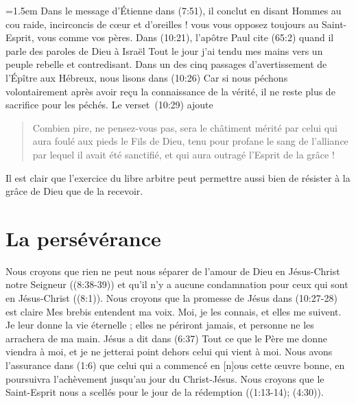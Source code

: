 \begin{digestpar}{}
\begin{pocketpar}{\emergencystretch=1.5em}
Dans le message d'Étienne dans
 (7:51), il conclut en disant\frcolon
 \Og Hommes au cou raide, incirconcis de cœur et d'oreilles !
 vous vous opposez toujours au Saint-Esprit, vous comme vos pères. \Fg{}
 Dans (10:21),
 l'apôtre Paul cite (65:2)
 quand il parle des paroles de Dieu à Israël\frcolon
 \Og Tout le jour j'ai tendu mes mains vers un peuple rebelle et contredisant. \Fg{}
 Dans un des cinq passages d'avertissement de l'Épître aux Hébreux,
 nous lisons dans (10:26)\frcolon
 \Og Car si nous péchons volontairement après avoir reçu la connaissance de la vérité,
 il ne reste plus de sacrifice pour les péchés. \Fg{}
 Le verset~(10:29) ajoute\frcolon
\end{pocketpar}
\end{digestpar}

\begin{quote}
\begin{digestpar}{}
\begin{pocketpar}{}
 \Og Combien pire, ne pensez-vous pas, sera le châtiment mérité par celui qui
 aura foulé aux pieds le Fils de Dieu, tenu pour profane le sang de l'alliance
 par lequel il avait été sanctifié, et qui aura outragé l'Esprit de la grâce ! \Fg{}
\end{pocketpar}
\end{digestpar}
\end{quote}

Il est clair que l'exercice du libre arbitre peut permettre aussi bien de résister
 à la grâce de Dieu que de la recevoir.

\section*{La persévérance}

\begin{digestpar}{}
Nous croyons que rien ne peut nous séparer de l'amour de Dieu en Jésus-Christ notre Seigneur
 ((8:38-39))
 et qu'il n'y a aucune condamnation pour ceux qui sont en Jésus-Christ
 ((8:1)).
 Nous croyons que la promesse de Jésus dans (10:27-28) est claire\frcolon
 \Og Mes brebis entendent ma voix. Moi, je les connais, et elles me suivent.
 Je leur donne la vie éternelle ; elles ne périront jamais,
 et personne ne les arrachera de ma main. \Fg{}
 Jésus a dit dans (6:37)\frcolon
 \Og Tout ce que le Père me donne viendra à moi,
 et je ne jetterai point dehors celui qui vient à moi. \Fg{}
 Nous avons l'assurance dans (1:6) \Og que celui qui a commencé
 en [n]ous cette œuvre bonne, en poursuivra l'achèvement jusqu'au jour
 du Christ-Jésus. \Fg{}
 Nous croyons que le Saint-Esprit nous a scellés
 pour le jour de la rédemption ((1:13-14);
 (4:30)).
\end{digestpar}

